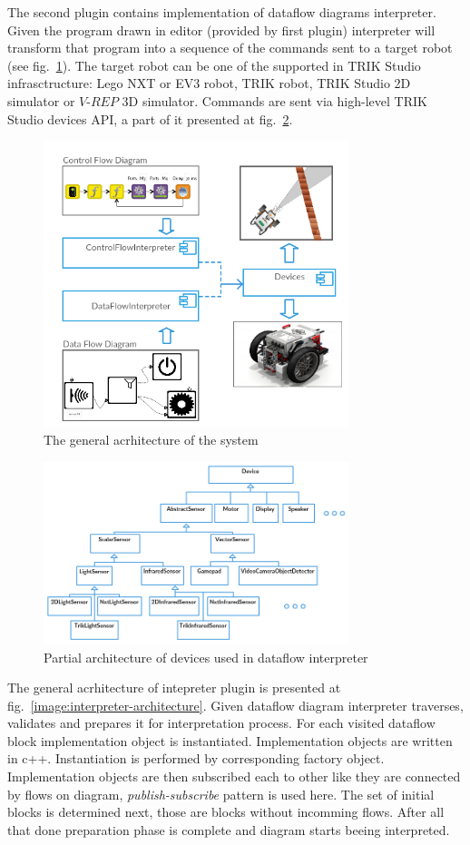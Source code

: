 \documentclass[conference,compsoc]{IEEEtran}
\begin{document}
The second plugin contains implementation of dataflow diagrams interpreter. Given the program drawn in editor (provided by first plugin) interpreter will transform that program into a sequence of the commands sent to a target robot (see fig.~\ref{image:common-architecture}). The target robot can be one of the supported in TRIK Studio infrasctructure: Lego NXT or EV3 robot, TRIK robot, TRIK Studio 2D simulator or $V\mbox{-}REP$ 3D simulator\cite{rohmer2013v}. Commands are sent via high-level TRIK Studio devices API, a part of it presented at fig.~\ref{image:devices-architecture}.

\begin{figure}[ht]
	\centering
	\includegraphics[width=3.5in]{Common.png}
	\caption{The general acrhitecture of the system}
	\label{image:common-architecture}
\end{figure}

\begin{figure}[ht]
	\centering
	\includegraphics[width=3.5in]{Devices.png}
	\caption{Partial architecture of devices used in dataflow interpreter}
	\label{image:devices-architecture}
\end{figure}

The general acrhitecture of intepreter plugin is presented at fig.~\ref{image:interpreter-architecture}. Given dataflow diagram interpreter traverses, validates and prepares it for interpretation process. For each visited dataflow block implementation object is instantiated. Implementation objects are written in c++. Instantiation is performed by corresponding factory object. Implementation objects are then subscribed each to other like they are connected by flows on diagram, \textit{publish-subscribe} pattern is used here. The set of initial blocks is determined next, those are blocks without incomming flows. After all that done preparation phase is complete and diagram starts beeing interpreted.
\end{document}

